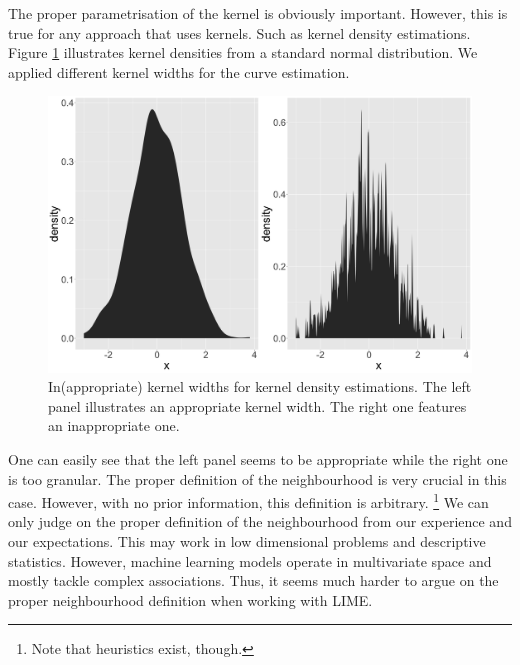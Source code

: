 \documentclass[
]{krantz}
\begin{document}
The proper parametrisation of the kernel is obviously important.
However, this is true for any approach that uses kernels.
Such as kernel density estimations.
Figure \ref{fig:lime-fig1} illustrates kernel densities from a standard normal distribution.
We applied different kernel widths for the curve estimation.

\begin{figure}

{\centering \includegraphics[width=0.99\linewidth]{images/04-09-01} 

}

\caption{In(appropriate) kernel widths for kernel density estimations. The left panel illustrates an appropriate kernel width. The right one features an inappropriate one.}\label{fig:lime-fig1}
\end{figure}

One can easily see that the left panel seems to be appropriate while the right one is too granular.
The proper definition of the neighbourhood is very crucial in this case.
However, with no prior information, this definition is arbitrary.
\footnote{Note that heuristics exist, though.}
We can only judge on the proper definition of the neighbourhood from our experience and our expectations.
This may work in low dimensional problems and descriptive statistics.
However, machine learning models operate in multivariate space and mostly tackle complex associations.
Thus, it seems much harder to argue on the proper neighbourhood definition when working with LIME.
\end{document}

